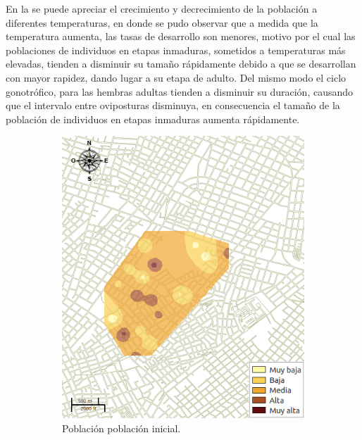 En la  se puede apreciar el crecimiento y decrecimiento de la población
a diferentes temperaturas, en donde se pudo observar que a medida que la temperatura aumenta, las
tasas de desarrollo son menores, motivo por el cual las poblaciones de individuos en etapas
inmaduras, sometidos a temperaturas más elevadas, tienden a disminuir su tamaño rápidamente debido
a que se desarrollan con mayor rapidez, dando lugar a su etapa de adulto. Del mismo modo el ciclo
gonotrófico, para las hembras adultas tienden a disminuir su duración, causando que el intervalo
entre oviposturas disminuya, en consecuencia el tamaño de la población de individuos en etapas
inmaduras aumenta rápidamente.

\begin{figure}[!t]
    \centering
    \begin{subfigure}[b]{0.225\textwidth}
        \includegraphics[width=\textwidth]{../book/capitulo-6/graphics/raster/temp-24-0.png}
        \caption{ Población población inicial.}
    \end{subfigure}
    ~~~~
    \begin{subfigure}[b]{0.225\textwidth}

\end{subfigure}
\end{figure}
